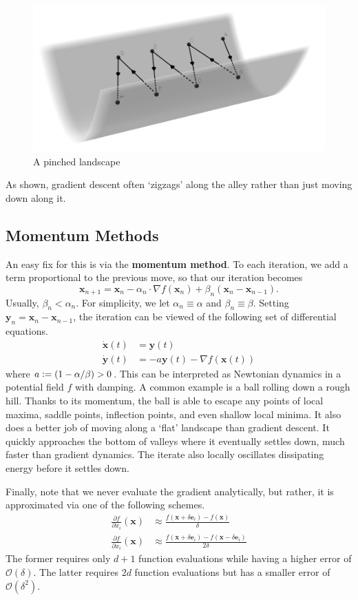 \begin{figure}[!ht]
    \centering
    \includegraphics[width=0.7\linewidth]{pinched.png}
    \caption{A pinched landscape}
    \label{fig:pinched}
\end{figure}

As shown, gradient descent often `zigzags' along the alley rather than just moving down along it. 

\subsection*{Momentum Methods}

An easy fix for this is via the \textbf{momentum method}. To each iteration, we add a term proportional to the previous move, so that our iteration becomes
\[
    \mathbf{x}_{n+1} = \mathbf{x}_n - \alpha_n \cdot \nabla f(\mathbf{x}_n) + \beta_n (\mathbf{x}_n - \mathbf{x}_{n-1}).
\]
Usually, $\beta_n < \alpha_n$. For simplicity, we let $\alpha_n \equiv \alpha$ and $\beta_n \equiv \beta$. Setting $\mathbf{y}_n = \mathbf{x}_n - \mathbf{x}_{n-1}$, the iteration can be viewed of the following set of differential equations. 
\begin{align*}
    \dot{\mathbf{x}}(t) &= \mathbf{y}(t) \\
    \dot{\mathbf{y}}(t) &= -a \mathbf{y}(t) - \nabla f(\mathbf{x}(t))
\end{align*}
where $a \vcentcolon= (1 - \alpha/\beta) > 0$. This can be interpreted as Newtonian dynamics in a potential field $f$ with damping. A common example is a ball rolling down a rough hill. Thanks to its momentum, the ball is able to escape any points of local maxima, saddle points, inflection points, and even shallow local minima. It also does a better job of moving along a `flat' landscape than gradient descent. It quickly approaches the bottom of valleys where it eventually settles down, much faster than gradient dynamics. The iterate also locally oscillates dissipating energy before it settles down. 

\medskip 

Finally, note that we never evaluate the gradient analytically, but rather, it is approximated via one of the following schemes.
\begin{align*}
    \frac{\partial f}{\partial x_i}(\mathbf{x}) &\approx \frac{f(\mathbf{x} + \delta \mathbf{e}_i) - f(\mathbf{x})}{\delta} \\
    \frac{\partial f}{\partial x_i}(\mathbf{x}) &\approx \frac{f(\mathbf{x} + \delta \mathbf{e}_i) - f(\mathbf{x} - \delta \mathbf{e}_i)}{2\delta}
\end{align*}
The former requires only $d+1$ function evaluations while having a higher error of $\mathcal{O}(\delta)$. The latter requires $2d$ function evaluations but has a smaller error of $\mathcal{O}(\delta^2)$. 